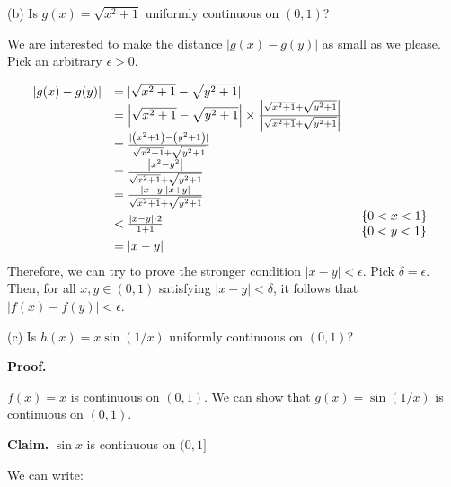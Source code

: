 \documentclass[10pt]{article}
\begin{document}
(b) Is $\displaystyle g( x) =\sqrt{x^{2} +1}$ uniformly continuous on $\displaystyle ( 0,1)$?



We are interested to make the distance $\displaystyle |g( x) -g( y) |$ as small as we please. Pick an arbitrary $\displaystyle \epsilon  >0$. 


\begin{equation*}
\begin{array}{ c l c }
|g( x) -g( y) | & =|\sqrt{x^{2} +1} -\sqrt{y^{2} +1} | & \\
 & =\left| \sqrt{x^{2} +1} -\sqrt{y^{2} +1}\right| \times \frac{\left| \sqrt{x^{2} +1} +\sqrt{y^{2} +1}\right| }{\left| \sqrt{x^{2} +1} +\sqrt{y^{2} +1}\right| } & \\
 & =\frac{|\left( x^{2} +1\right) -\left( y^{2} +1\right) |}{\sqrt{x^{2} +1} +\sqrt{y^{2} +1}} & \\
 & =\frac{\left| x^{2} -y^{2}\right| }{\sqrt{x^{2} +1} +\sqrt{y^{2} +1}} & \\
 & =\frac{| x-y| | x+y| }{\sqrt{x^{2} +1} +\sqrt{y^{2} +1}} & \\
 & < \frac{| x-y| \cdot 2}{1+1} &  \begin{array}{l}
\{0< x< 1\}\\
\{0< y< 1\}
\end{array}\\
 & =| x-y|  & 
\end{array}
\end{equation*}
Therefore, we can try to prove the stronger condition $\displaystyle |x-y|< \epsilon $. Pick $\displaystyle \delta =\epsilon $. Then, for all $\displaystyle x,y\in ( 0,1)$ satisfying $\displaystyle |x-y|< \delta $, it follows that $\displaystyle |f( x) -f( y) |< \epsilon $.



(c) Is $\displaystyle h( x) =x\sin( 1/x)$ uniformly continuous on $\displaystyle ( 0,1)$?



\textbf{Proof.}



$\displaystyle f( x) =x$ is continuous on $\displaystyle ( 0,1) .$ We can show that $\displaystyle g( x) =\sin( 1/x)$ is continuous on $\displaystyle ( 0,1)$.



\textbf{Claim. }$\displaystyle \sin x$ is continuous on $\displaystyle ( 0,1]$



We can write:
\end{document}
